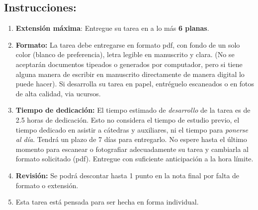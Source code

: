 \documentclass{article}
\theoremstyle{plain}
\theoremstyle{definition}
\theoremstyle{Azul}
\begin{document}
\subsection*{Instrucciones:} 
\begin{enumerate}
\item \textbf{Extensión máxima}: Entregue su tarea en a lo más \textbf{6 planas}.
    \item \textbf{Formato:} La tarea debe entregarse en formato pdf, con fondo de un solo color (blanco de preferencia), letra legible en manuscrito y clara. (No se aceptarán documentos tipeados o generados por computador, pero si tiene alguna manera de escribir en manuscrito directamente de manera digital lo puede hacer).
    Si desarrolla su tarea en papel, entréguelo escaneados o en fotos de alta calidad, via ucursos.    \item \textbf{Tiempo de dedicación:} El tiempo estimado de \emph{desarrollo} de la tarea es de 2.5 horas de dedicación. Esto no considera el tiempo de estudio previo, el tiempo dedicado en asistir a cátedras y auxiliares, ni el tiempo para \emph{ponerse al día}. Tendrá un plazo de 7 días para entregarlo. No espere hasta el último momento para escanear o fotografiar adecuadamente su tarea y cambiarla al formato solicitado (pdf). Entregue con suficiente anticipación a la hora límite.
    \item \textbf{Revisión:} Se podrá descontar hasta 1 punto en la nota final por falta de formato o extensión.
\item Esta tarea está pensada para ser hecha en forma individual.
    \end{enumerate}
\end{document}
